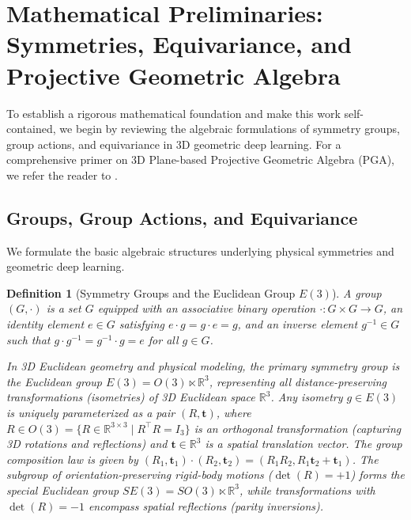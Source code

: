 \documentclass[10pt]{article}
\newtheorem{definition}{Definition}
\begin{document}
\section{Mathematical Preliminaries: Symmetries, Equivariance, and Projective Geometric Algebra}
\label{sec:preliminaries}
\label{sec:pga_primer}

To establish a rigorous mathematical foundation and make this work self-contained, we begin by reviewing the algebraic formulations of symmetry groups, group actions, and equivariance in 3D geometric deep learning. For a comprehensive primer on 3D Plane-based Projective Geometric Algebra (PGA), we refer the reader to \citet{pga4cs2020,Roelfs_2023}.

\subsection{Groups, Group Actions, and Equivariance}
\label{subsec:groups_equivariance}

We formulate the basic algebraic structures underlying physical symmetries and geometric deep learning.

\begin{definition}[Symmetry Groups and the Euclidean Group $E(3)$]
\label{def:group}
A \emph{group} $(G, \cdot)$ is a set $G$ equipped with an associative binary operation $\cdot: G \times G \to G$, an identity element $e \in G$ satisfying $e \cdot g = g \cdot e = g$, and an inverse element $g^{-1} \in G$ such that $g \cdot g^{-1} = g^{-1} \cdot g = e$ for all $g \in G$.

In 3D Euclidean geometry and physical modeling, the primary symmetry group is the \emph{Euclidean group} $E(3) = O(3) \ltimes \mathbb{R}^3$, representing all distance-preserving transformations (isometries) of 3D Euclidean space $\mathbb{R}^3$. Any isometry $g \in E(3)$ is uniquely parameterized as a pair $(R, \mathbf{t})$, where $R \in O(3) = \{R \in \mathbb{R}^{3 \times 3} \mid R^\top R = I_3\}$ is an orthogonal transformation (capturing 3D rotations and reflections) and $\mathbf{t} \in \mathbb{R}^3$ is a spatial translation vector. The group composition law is given by $(R_1, \mathbf{t}_1) \cdot (R_2, \mathbf{t}_2) = (R_1 R_2, R_1 \mathbf{t}_2 + \mathbf{t}_1)$. The subgroup of orientation-preserving rigid-body motions ($\det(R) = +1$) forms the \emph{special Euclidean group} $SE(3) = SO(3) \ltimes \mathbb{R}^3$, while transformations with $\det(R) = -1$ encompass spatial reflections (parity inversions).
\end{definition}
\end{document}
